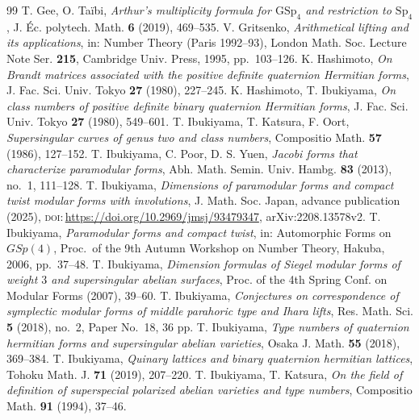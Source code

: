 \documentclass[10pt,a4paper]{amsart}
\providecommand{\doi}[1]{\textsc{doi:}\,\url{https://doi.org/#1}}
\begin{document}
\begin{thebibliography}{99}
 T. Gee, O. Ta\"ibi, \emph{Arthur's multiplicity formula for $\mathrm{GSp}_4$ and restriction to $\mathrm{Sp}_4$}, J. \'Ec. polytech. Math. \textbf{6} (2019), 469--535.
 V. Gritsenko, \emph{Arithmetical lifting and its applications}, in: Number Theory (Paris 1992--93), London Math. Soc. Lecture Note Ser. \textbf{215}, Cambridge Univ. Press, 1995, pp.~103--126.
 K. Hashimoto, \emph{On Brandt matrices associated with the positive definite quaternion Hermitian forms}, J. Fac. Sci. Univ. Tokyo \textbf{27} (1980), 227--245.
 K. Hashimoto, T. Ibukiyama, \emph{On class numbers of positive definite binary quaternion Hermitian forms}, J. Fac. Sci. Univ. Tokyo \textbf{27} (1980), 549--601.
 T. Ibukiyama, T. Katsura, F. Oort, \emph{Supersingular curves of genus two and class numbers}, Compositio Math. \textbf{57} (1986), 127--152.
 T. Ibukiyama, C. Poor, D. S. Yuen, \emph{Jacobi forms that characterize paramodular forms}, Abh. Math. Semin. Univ. Hambg. \textbf{83} (2013), no.~1, 111--128.
 T. Ibukiyama, \emph{Dimensions of paramodular forms and compact twist modular forms with involutions}, J. Math. Soc. Japan, advance publication (2025), \doi{10.2969/jmsj/93479347}, arXiv:2208.13578v2.
 T. Ibukiyama, \emph{Paramodular forms and compact twist}, in: Automorphic Forms on $GSp(4)$, Proc.\ of the 9th Autumn Workshop on Number Theory, Hakuba, 2006, pp.~37--48.
 T. Ibukiyama, \emph{Dimension formulas of Siegel modular forms of weight $3$ and supersingular abelian surfaces}, Proc. of the 4th Spring Conf. on Modular Forms (2007), 39--60.
 T. Ibukiyama, \emph{Conjectures on correspondence of symplectic modular forms of middle parahoric type and Ihara lifts}, Res. Math. Sci. \textbf{5} (2018), no.~2, Paper No.~18, 36 pp.
 T. Ibukiyama, \emph{Type numbers of quaternion hermitian forms and supersingular abelian varieties}, Osaka J. Math. \textbf{55} (2018), 369--384.
 T. Ibukiyama, \emph{Quinary lattices and binary quaternion hermitian lattices}, Tohoku Math. J. \textbf{71} (2019), 207--220.
 T. Ibukiyama, T. Katsura, \emph{On the field of definition of superspecial polarized abelian varieties and type numbers}, Compositio Math. \textbf{91} (1994), 37--46.

\end{thebibliography}
\end{document}
